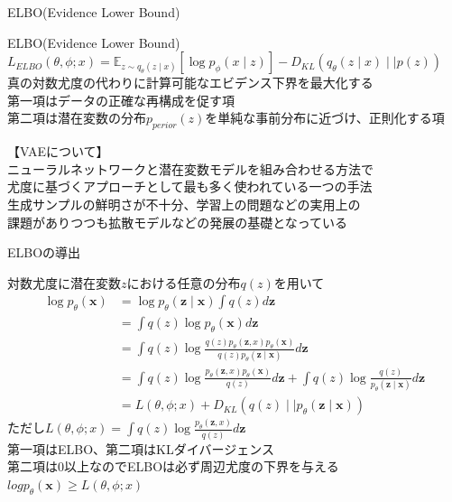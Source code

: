 \begin{frame}{ELBO(Evidence Lower Bound)}
    \begin{block}{ELBO(Evidence Lower Bound)}
        $\mathit{L}_{\mathit{ELBO}}(\theta,\phi;x)=\mathbb{E}_{z\sim q_{\theta}(\mathit{z}\mid\mathit{x})}[\log p_{\phi}(\mathit{x}\mid\mathit{z})]-\mathit{D}_{KL}(q_{\theta}(\mathit{z}\mid\mathit{x})\mid\mid p(\mathit{z}))$\\
        \vspace{1em}
        真の対数尤度の代わりに計算可能なエビデンス下界を最大化する\\
        \vspace{1em}
        第一項はデータの正確な再構成を促す項\\
        第二項は潜在変数の分布$p_{perior}(\mathit{z})$を単純な事前分布に近づけ、正則化する項\\
    \end{block}
    【VAEについて】\\
    ニューラルネットワークと潜在変数モデルを組み合わせる方法で\\
    尤度に基づくアプローチとして最も多く使われている一つの手法\\
    \vspace{1em}
    生成サンプルの鮮明さが不十分、学習上の問題などの実用上の\\課題がありつつも拡散モデルなどの発展の基礎となっている

\end{frame}
\begin{frame}{ELBOの導出}
    \begin{exampleblock}{}
        対数尤度に潜在変数$\mathit{z}$における任意の分布$q(\mathit{z})$を用いて
            \begin{align*}
        \log p_{\theta}(\mathbf{x}) &= \log p_{\theta}(\mathbf{z}\mid\mathbf{x})\int q(\mathit{z})d\mathbf{z}\\
        &=\int q(\mathit{z})\log p_{\theta}(\mathbf{x})d\mathbf{z}\\
        &=\int q(\mathit{z})\log \frac{q(\mathit{z})p_{\theta}(\mathbf{z}, \mathit{x})p_{\theta}(\mathbf{x})}{q(\mathit{z})p_{\theta}(\mathbf{z}\mid\mathbf{x})}d\mathbf{z}\\
        &=\int q(\mathit{z})\log \frac{p_{\theta}(\mathbf{z}, \mathit{x})p_{\theta}(\mathbf{x})}{q(\mathit{z})}d\mathbf{z}
        +\int q(\mathit{z})\log \frac{q(\mathit{z})}{p_{\theta}(\mathbf{z}\mid\mathbf{x})}d\mathbf{z}\\
        &=\mathit{L}(\theta,\phi;x)+\mathit{D}_{KL}(q(\mathit{z})\mid\mid p_{\theta}(\mathbf{z}\mid\mathbf{x}))
    \end{align*}
    ただし$\mathit{L}(\theta,\phi;x)=\int q(\mathit{z})\log \frac{p_{\theta}(\mathbf{z}, \mathit{x})}{q(\mathit{z})}d\mathbf{z}$\\
    第一項はELBO、第二項はKLダイバージェンス\\
    第二項は0以上なのでELBOは必ず周辺尤度の下界を与える$log p_{\theta}(\mathbf{x})\geq \mathit{L}(\theta,\phi;x)$
    \end{exampleblock}
\end{frame}
